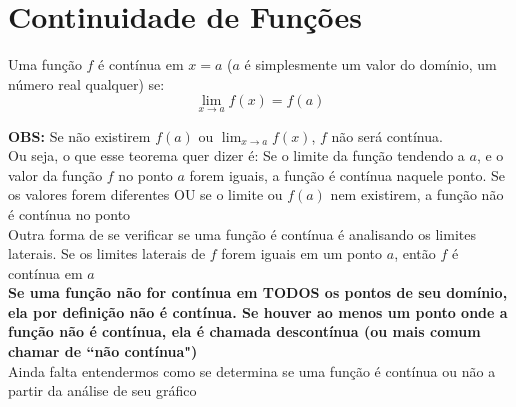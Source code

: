 \documentclass{article}
\begin{document}
\section{Continuidade de Funções}
Uma função $f$ é contínua em $x = a$ ($a$ é simplesmente um valor do domínio, um número real qualquer) se:
\[
\lim_{x \to a} f(x) = f(a)
\]

\noindent \textbf{OBS:} Se não existirem $f(a)$ ou $\displaystyle\lim_{x \to a} f(x)$, $f$ não será contínua.
\\[10pt]
Ou seja, o que esse teorema quer dizer é: Se o limite da função tendendo a $a$, e o valor da função $f$ no ponto $a$ forem iguais, a função é contínua naquele ponto. Se os valores forem diferentes OU se o limite ou $f(a)$ nem existirem, a função não é contínua no ponto
\\[10pt]
Outra forma de se verificar se uma função é contínua é analisando os limites laterais. Se os limites laterais de $f$ forem iguais em um ponto $a$, então $f$ é contínua em $a$
\\[10pt]
\textbf{Se uma função não for contínua em TODOS os pontos de seu domínio, ela por definição não é contínua. Se houver ao menos um ponto onde a função não é contínua, ela é chamada descontínua (ou mais comum chamar de ``não contínua")}\\[10pt]
Ainda falta entendermos como se determina se uma função é contínua ou não a partir da análise de seu gráfico
\end{document}
